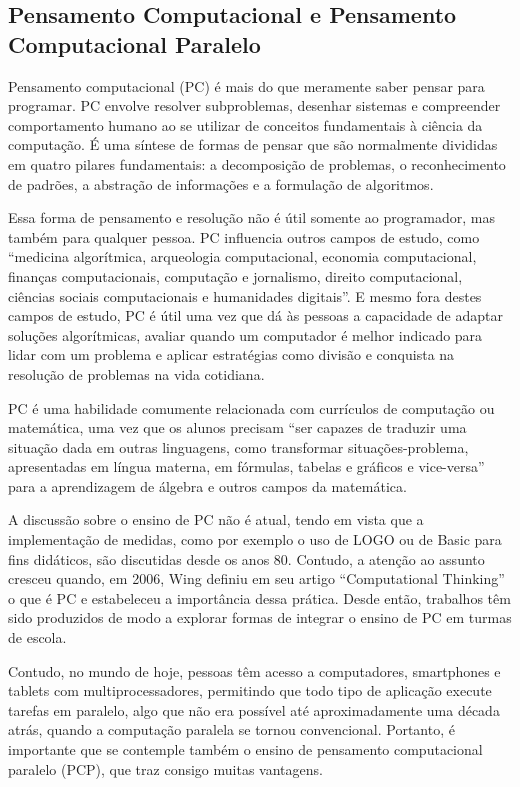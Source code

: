 \documentclass[conference]{IEEEtran}
\newcommand{\xexeo}[1]{\ednote{\textcolor{red}{Xexéo - #1}}}
\begin{document}
\subsection{Pensamento Computacional e Pensamento Computacional Paralelo}

Pensamento computacional (PC) é mais do que meramente saber pensar para programar. PC envolve resolver subproblemas, desenhar sistemas e compreender comportamento humano ao se utilizar de conceitos fundamentais à ciência da computação\cite{b2}. É uma síntese de formas de pensar que são normalmente divididas em quatro pilares fundamentais: a decomposição de problemas, o reconhecimento de padrões, a abstração de informações e a formulação de algoritmos\cite{b6}.

 Essa forma de pensamento e resolução não é útil somente ao programador, mas também para qualquer pessoa. PC influencia outros campos de estudo, como ``medicina algorítmica, arqueologia computacional, economia computacional, finanças computacionais, computação e jornalismo, direito computacional, ciências sociais computacionais e humanidades digitais\cite{b7}''. E mesmo fora destes campos de estudo, PC é útil uma vez que dá às pessoas a capacidade de adaptar soluções algorítmicas, avaliar quando um computador é melhor indicado para lidar com um problema e aplicar estratégias como divisão e conquista\xexeo{acho que me português é ``dividir para conquistar'', verificar em um livro de algoritmos?} na resolução de problemas na vida cotidiana\cite{b7}.

PC é uma habilidade comumente relacionada com currículos de computação\cite{b8} ou matemática, uma vez que os alunos precisam ``ser capazes de traduzir uma situação dada em outras linguagens, como transformar situações-problema, apresentadas em língua materna, em fórmulas, tabelas e gráficos e vice-versa''\cite{b4} para a aprendizagem de álgebra e outros campos da matemática. 

A discussão sobre o ensino de PC não é atual, tendo em vista que a implementação de medidas, como por exemplo o uso de LOGO ou de Basic para fins didáticos, são discutidas desde os anos 80\cite{b9}. Contudo, a atenção ao assunto cresceu quando, em 2006, Wing definiu em seu artigo ``Computational Thinking'' o que é PC e estabeleceu a importância dessa prática. Desde então, trabalhos têm sido produzidos de modo a explorar formas de integrar o ensino de PC em turmas de escola\cite{b1}\cite{b10}\cite{b11}\cite{b12}.

Contudo, no mundo de hoje, pessoas têm acesso a computadores, smartphones e tablets com multiprocessadores, permitindo que todo tipo de aplicação execute tarefas em paralelo, algo que não era possível até aproximadamente uma década atrás, quando a computação paralela se tornou convencional.  Portanto, é importante que se contemple também o ensino de pensamento computacional paralelo (PCP),  que traz consigo muitas vantagens\cite{b5}.
\end{document}
